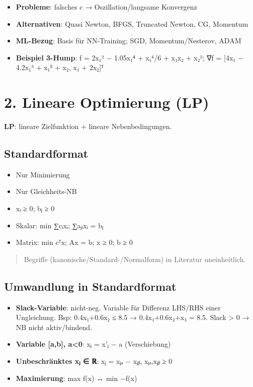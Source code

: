 \documentclass[11pt, a4paper]{article}
\begin{document}
\begin{itemize}
  \item \textbf{Probleme}: falsches c → Oszillation/langsame Konvergenz
  \item \textbf{Alternativen}: Quasi Newton, BFGS, Truncated Newton, CG, Momentum
  \item \textbf{ML-Bezug}: Basis für NN-Training; SGD, Momentum/Nesterov, ADAM
  \item \textbf{Beispiel 3-Hump}: f = 2x₁² − 1.05x₁⁴ + x₁⁶/6 + x₁x₂ + x₂²; ∇f = [4x₁ − 4.2x₁³ + x₁⁵ + x₂, x₁ + 2x₂]ᵀ
\end{itemize}


\section{2. Lineare Optimierung (LP)}

\textbf{LP}: lineare Zielfunktion + lineare Nebenbedingungen.



\subsection{Standardformat}
\begin{itemize}
  \item Nur Minimierung
  \item Nur Gleichheits-NB
  \item xᵢ ≥ 0; bⱼ ≥ 0
  \item Skalar: min ∑cᵢxᵢ; ∑aⱼᵢxᵢ = bⱼ
  \item Matrix: min cᵀx; Ax = b; x ≥ 0; b ≥ 0
\end{itemize}

\begin{quote}
Begriffe (kanonische/Standard-/Normalform) in Literatur uneinheitlich.
\end{quote}


\subsection{Umwandlung in Standardformat}
\begin{itemize}
  \item \textbf{Slack-Variable}: nicht-neg. Variable für Differenz LHS/RHS einer Ungleichung. Bsp: 0.4x₁+0.6x₂ ≤ 8.5 → 0.4x₁+0.6x₂+x₃ = 8.5. Slack > 0 → NB nicht aktiv/bindend.
  \item \textbf{Variable [a,b], a<0}: xⱼ = x'ⱼ − a (Verschiebung)
  \item \textbf{Unbeschränktes xⱼ ∈ ℝ}: xⱼ = xⱼₐ − xⱼᵦ, xⱼₐ,xⱼᵦ ≥ 0
  \item \textbf{Maximierung}: max f(x) ↔ min −f(x)
\end{itemize}
\end{document}
